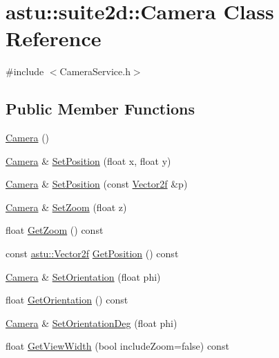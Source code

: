 \hypertarget{classastu_1_1suite2d_1_1Camera}{}\section{astu\+:\+:suite2d\+:\+:Camera Class Reference}
\label{classastu_1_1suite2d_1_1Camera}


{\ttfamily \#include $<$Camera\+Service.\+h$>$}

\subsection*{Public Member Functions}
\begin{DoxyCompactItemize}
\item 
\hyperlink{classastu_1_1suite2d_1_1Camera_ab0b68d23b81551c747a03d4882a8473a}{Camera} ()
\item 
\hyperlink{classastu_1_1suite2d_1_1Camera}{Camera} \& \hyperlink{classastu_1_1suite2d_1_1Camera_aad0053eb029496040349796201ed9d08}{Set\+Position} (float x, float y)
\item 
\hyperlink{classastu_1_1suite2d_1_1Camera}{Camera} \& \hyperlink{classastu_1_1suite2d_1_1Camera_aada7d3c66378ebe95f7464be6ee516e6}{Set\+Position} (const \hyperlink{classastu_1_1Vector2}{Vector2f} \&p)
\item 
\hyperlink{classastu_1_1suite2d_1_1Camera}{Camera} \& \hyperlink{classastu_1_1suite2d_1_1Camera_a39adef429a83c4e9fdf47ddafbb4b0b9}{Set\+Zoom} (float z)
\item 
float \hyperlink{classastu_1_1suite2d_1_1Camera_a6866e73e4f7463b281c84f67cc3e7184}{Get\+Zoom} () const
\item 
const \hyperlink{classastu_1_1Vector2}{astu\+::\+Vector2f} \hyperlink{classastu_1_1suite2d_1_1Camera_abe5d997e84d739243f0e943bb81472dc}{Get\+Position} () const
\item 
\hyperlink{classastu_1_1suite2d_1_1Camera}{Camera} \& \hyperlink{classastu_1_1suite2d_1_1Camera_a6885dcb17c88b435d7d90d06b60bbcb0}{Set\+Orientation} (float phi)
\item 
float \hyperlink{classastu_1_1suite2d_1_1Camera_ad48c85024f99c5018ed9e3733ca74301}{Get\+Orientation} () const
\item 
\hyperlink{classastu_1_1suite2d_1_1Camera}{Camera} \& \hyperlink{classastu_1_1suite2d_1_1Camera_a97ded73b2b33b3dae8465f6afa9f071c}{Set\+Orientation\+Deg} (float phi)
\item 
float \hyperlink{classastu_1_1suite2d_1_1Camera_aca60878cdd99542be3f42d273104a0c4}{Get\+View\+Width} (bool include\+Zoom=false) const

\end{DoxyCompactItemize}
